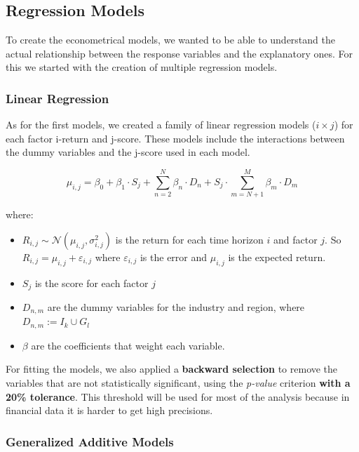 \documentclass[11pt,english,a4paper,hidelinks]{book}
\begin{document}
\subsection{Regression Models}

To create the econometrical models, we wanted to be able to understand the actual relationship between the response variables and the explanatory ones. For this we started with the creation of multiple regression models.

\subsubsection{Linear Regression}

As for the first models, we created a family of linear regression models (\(i \times j\)) for each factor i-return and j-score. These models include the interactions between the dummy variables and the j-score used in each model.

\begin{equation}
    \mu_{i,j} = \beta_0+\beta_1 \cdot S_j + 
\sum_{n=2}^{N}\beta_{n}\cdot D_n + S_j \cdot \sum_{m=N+1}^{M}\beta_{m}\cdot D_m
\end{equation}

\noindent where:
\begin{itemize}
    \item  \(R_{i,j} \sim \mathcal{N}(\mu_{i,j}, \sigma_{i,j}^2)\) is the return for each time horizon \(i\) and factor \(j\). So \(R_{i,j} = \mu_{i,j} + \varepsilon_{i,j}\) where \(\varepsilon_{i,j}\) is the error and \(\mu_{i,j}\) is the expected return.
    \item \(S_j\) is the score for each factor \(j\)
    \item \(D_{n,m}\) are the dummy variables for the industry and region, where \(D_{n,m} := I_k \cup G_l\)
    \item \(\beta\) are the coefficients that weight each variable.
\end{itemize}

\noindent For fitting the models, we also applied a \textbf{backward selection} to remove the variables that are not statistically significant, using the \textit{p-value} criterion \textbf{with a 20\% tolerance}. This threshold will be used for most of the analysis because in financial data it is harder to get high precisions.

\subsubsection{Generalized Additive Models}
\end{document}
